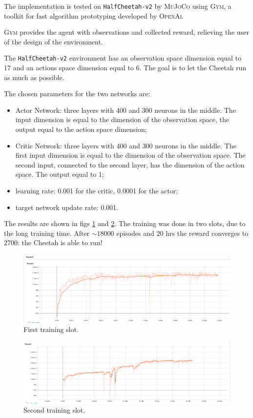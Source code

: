 \documentclass[10pt,a4paper]{scrartcl}
\begin{document}
The implementation is tested on \texttt{HalfCheetah-v2} by \textsc{MuJoCo} using \textsc{Gym}, a toolkit for fast algorithm prototyping developed by \textsc{OpenAi}.

\textsc{Gym} provides the agent with observations and collected reward, relieving the user of the design of the environment.

The \texttt{HalfCheetah-v2} environment has an observation space dimension equal to 17 and an actions space dimension equal to 6. The goal is to let the Cheetah run as much as possible.

The chosen parameters for the two networks are:
\begin{itemize}
	\item Actor Network: three layers with 400 and 300 neurons in the middle. The input dimension is equal to the dimension of the observation space, the output equal to the action space dimension;
	\item Critic Network: three layers with 400 and 300 neurons in the middle. The first input dimension is equal to the dimension of the observation space. The second input, connected to the second layer, has the dimension of the action space. The output equal to 1;
	\item learning rate: 0.001 for the critic, 0.0001 for the actor;
	\item target network update rate: 0.001.
\end{itemize}

The results are shown in figs \ref{fig:cheetahrew1} and \ref{fig:cheetahrew2}. The training was done in two slots, due to the long training time. After $ \sim 18000 $ episodes and 20 hrs the reward converges to 2700: the Cheetah is able to run!

\begin{figure}[h]
	\centering
	\includegraphics[width=1.0\linewidth]{images/cheetah_rew1}
	\caption{First training slot.}
	\label{fig:cheetahrew1}
\end{figure}
\begin{figure}[h]
	\centering
	\includegraphics[width=1.0\linewidth]{images/cheetah_rew2}
	\caption{Second training slot.}
	\label{fig:cheetahrew2}
\end{figure}
\end{document}
